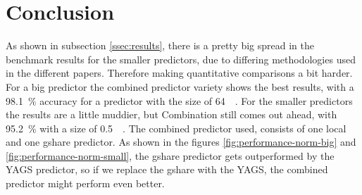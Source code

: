 \section{Conclusion}
\label{sec:conclusion}
As shown in subsection \ref{ssec:results}, there is a pretty big spread in the benchmark results for the smaller predictors, due to differing methodologies used in the different papers.
Therefore making quantitative comparisons a bit harder.
For a big predictor the combined predictor variety shows the best results, with a \SI{98.1}{\percent} accuracy for a predictor with the size of \SI{64}{\kilo\byte}.
For the smaller predictors the results are a little muddier, but Combination still comes out ahead, with \SI{95.2}{\percent} with a size of \SI{0.5}{\kilo\byte}.
The combined predictor used, consists of one local and one gshare predictor.
As shown in the figures \ref{fig:performance-norm-big} and \ref{fig:performance-norm-small}, the gshare predictor gets outperformed by the YAGS predictor, so if we replace the gshare with the YAGS, the combined predictor might perform even better.